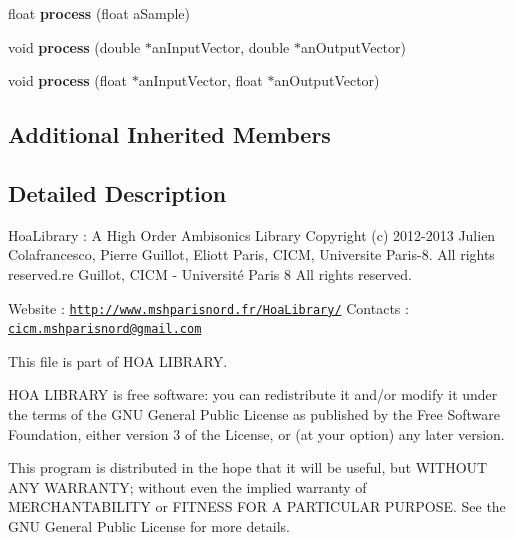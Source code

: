 \begin{DoxyCompactItemize}
\item 
\hypertarget{class_filter_one_pole_ad558f13f57747ecddcf0d652f25549f6}{float {\bfseries process} (float a\-Sample)}\label{class_filter_one_pole_ad558f13f57747ecddcf0d652f25549f6}

\item 
\hypertarget{class_filter_one_pole_ae776545e9f8dae0cf206db64a11e69a6}{void {\bfseries process} (double $\ast$an\-Input\-Vector, double $\ast$an\-Output\-Vector)}\label{class_filter_one_pole_ae776545e9f8dae0cf206db64a11e69a6}

\item 
\hypertarget{class_filter_one_pole_aac18838d9d423c8053323463106caa4e}{void {\bfseries process} (float $\ast$an\-Input\-Vector, float $\ast$an\-Output\-Vector)}\label{class_filter_one_pole_aac18838d9d423c8053323463106caa4e}

\end{DoxyCompactItemize}
\subsection*{Additional Inherited Members}


\subsection{Detailed Description}
Hoa\-Library \-: A High Order Ambisonics Library Copyright (c) 2012-\/2013 Julien Colafrancesco, Pierre Guillot, Eliott Paris, C\-I\-C\-M, Universite Paris-\/8. All rights reserved.\-re Guillot, C\-I\-C\-M -\/ Université Paris 8 All rights reserved.

Website \-: \href{http://www.mshparisnord.fr/HoaLibrary/}{\tt http\-://www.\-mshparisnord.\-fr/\-Hoa\-Library/} Contacts \-: \href{mailto:cicm.mshparisnord@gmail.com}{\tt cicm.\-mshparisnord@gmail.\-com}

This file is part of H\-O\-A L\-I\-B\-R\-A\-R\-Y.

H\-O\-A L\-I\-B\-R\-A\-R\-Y is free software\-: you can redistribute it and/or modify it under the terms of the G\-N\-U General Public License as published by the Free Software Foundation, either version 3 of the License, or (at your option) any later version.

This program is distributed in the hope that it will be useful, but W\-I\-T\-H\-O\-U\-T A\-N\-Y W\-A\-R\-R\-A\-N\-T\-Y; without even the implied warranty of M\-E\-R\-C\-H\-A\-N\-T\-A\-B\-I\-L\-I\-T\-Y or F\-I\-T\-N\-E\-S\-S F\-O\-R A P\-A\-R\-T\-I\-C\-U\-L\-A\-R P\-U\-R\-P\-O\-S\-E. See the G\-N\-U General Public License for more details.

